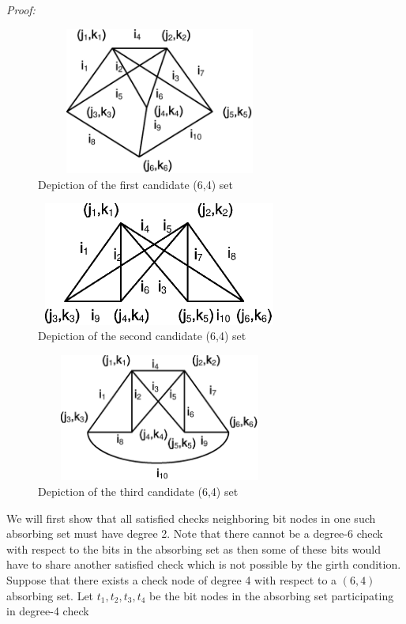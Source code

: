 \noindent \textit{Proof:}
\begin{figure}[ht]
\center\includegraphics[width=3.2in,height=1.9in]{Drawing641_1.eps}
\caption{Depiction of the first candidate (6,4) set}\label{fig64a}
\end{figure}
\begin{figure}\center
\includegraphics[width=3.2in,height=1.6in]{Drawing643_1.eps}
\caption{Depiction of the second candidate (6,4)
set}\label{fig64b}
\end{figure}
\begin{figure}
\center\includegraphics[width=3.2in,height=1.65in]{Drawing642_2.eps}
\caption{Depiction of the third candidate (6,4) set} \label{fig64c}
\end{figure}
We will first show that all satisfied checks neighboring bit nodes
in one such absorbing set must have degree 2. Note that there
cannot be a degree-6 check with respect to the bits in the
absorbing set as then some of these bits would have to share
another satisfied check which is not possible by the girth
condition. Suppose that there exists a check node of degree 4 with
respect to a $(6,4)$ absorbing set. Let $t_1, t_2,t_3,t_4$ be the
bit nodes in the absorbing set participating in degree-4 check
